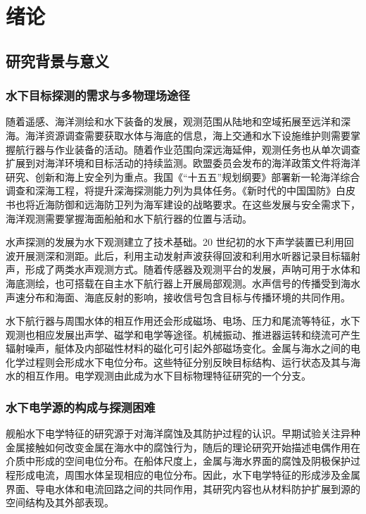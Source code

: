 \chapter{绪论}
\section{研究背景与意义}
\subsection{水下目标探测的需求与多物理场途径}
随着遥感、海洋测绘和水下装备的发展，观测范围从陆地和空域拓展至远洋和深海。海洋资源调查需要获取水体与海底的信息，海上交通和水下设施维护则需要掌握航行器与作业装备的活动。随着作业范围向深远海延伸，观测任务也从单次调查扩展到对海洋环境和目标活动的持续监测。欧盟委员会发布的海洋政策文件将海洋研究、创新和海上安全列为重点\cite{euOceanPact2025}。我国《“十五五”规划纲要》部署新一轮海洋综合调查和深海工程，将提升深海探测能力列为具体任务\cite{chinaPlan2026}。《新时代的中国国防》白皮书也将近海防御和远海防卫列为海军建设的战略要求\cite{chinaDefense2019}。在这些发展与安全需求下，海洋观测需要掌握海面船舶和水下航行器的位置与活动。

水声探测的发展为水下观测建立了技术基础。20 世纪初的水下声学装置已利用回波开展测深和测距\cite{fessenden1923}。此后，利用主动发射声波获得回波和利用水听器记录目标辐射声，形成了两类水声观测方式。随着传感器及观测平台的发展，声呐可用于水体和海底测绘，也可搭载在自主水下航行器上开展局部观测\cite{noaaAuv}。水声信号的传播受到海水声速分布和海面、海底反射的影响，接收信号包含目标与传播环境的共同作用\cite{gebbie2014}。

水下航行器与周围水体的相互作用还会形成磁场、电场、压力和尾流等特征，水下观测也相应发展出声学、磁学和电学等途径\cite{alin2008}。机械振动、推进器运转和绕流可产生辐射噪声\cite{liu2019sail}，艇体及内部磁性材料的磁化可引起外部磁场变化\cite{bullard1961,bosser2014}。金属与海水之间的电化学过程则会形成水下电位分布\cite{thiel2020}。这些特征分别反映目标结构、运行状态及其与海水的相互作用。电学观测由此成为水下目标物理特征研究的一个分支。

\subsection{水下电学源的构成与探测困难}

舰船水下电学特征的研究源于对海洋腐蚀及其防护过程的认识。早期试验关注异种金属接触如何改变金属在海水中的腐蚀行为，随后的理论研究开始描述电偶作用在介质中形成的空间电位分布\cite{davy1824,waber1953}。在船体尺度上，金属与海水界面的腐蚀及阴极保护过程形成电流，周围水体呈现相应的电位分布\cite{thiel2020}。因此，水下电学特征的形成涉及金属界面、导电水体和电流回路之间的共同作用，其研究内容也从材料防护扩展到源的空间结构及其外部表现。

